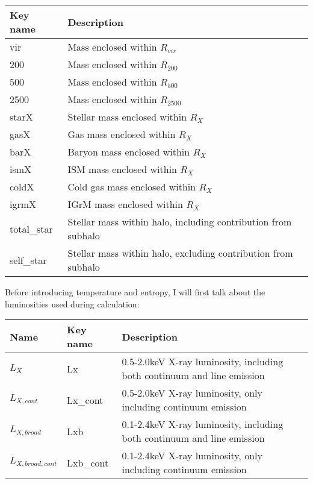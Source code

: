 \documentclass[letterpaper,10pt,english]{sphinxmanual}
\begin{document}
\begin{savenotes}\sphinxattablestart
\centering
\begin{tabulary}{\linewidth}[t]{|T|T|}
\hline
\sphinxstyletheadfamily 
Key name
&\sphinxstyletheadfamily 
Description
\\
\hline
vir
&
Mass enclosed within \(R_{vir}\)
\\
&
Mass enclosed within \(R_{200}\)
\\
&
Mass enclosed within \(R_{500}\)
\\
&
Mass enclosed within \(R_{2500}\)
\\
\hline
starX
&
Stellar mass enclosed within \(R_{X}\)
\\
\hline
gasX
&
Gas mass enclosed within \(R_{X}\)
\\
\hline
barX
&
Baryon mass enclosed within \(R_{X}\)
\\
\hline
ismX
&
ISM mass enclosed within \(R_{X}\)
\\
\hline
coldX
&
Cold gas mass enclosed within \(R_{X}\)
\\
\hline
igrmX
&
IGrM mass enclosed within \(R_{X}\)
\\
\hline
total\_star
&
Stellar mass within halo, including contribution from subhalo
\\
\hline
self\_star
&
Stellar mass within halo, excluding contribution from subhalo
\\
\hline
\end{tabulary}
\par
\sphinxattableend\end{savenotes}

Before introducing temperature and entropy, I will first talk about the
luminosities used during calculation:


\begin{savenotes}\sphinxattablestart
\centering
\begin{tabulary}{\linewidth}[t]{|T|T|T|}
\hline
\sphinxstyletheadfamily 
Name
&\sphinxstyletheadfamily 
Key name
&\sphinxstyletheadfamily 
Description
\\
\hline
\(L_X\)
&
Lx
&
0.5-2.0keV X-ray luminosity, including both continuum and line emission
\\
\hline
\(L_{X, cont}\)
&
Lx\_cont
&
0.5-2.0keV X-ray luminosity, only including continuum emission
\\
\hline
\(L_{X, broad}\)
&
Lxb
&
0.1-2.4keV X-ray luminosity, including both continuum and line emission
\\
\hline
\(L_{X, broad, cont}\)
&
Lxb\_cont
&
0.1-2.4keV X-ray luminosity, only including continuum emission
\\
\hline
\end{tabulary}
\par
\sphinxattableend\end{savenotes}
\end{document}
